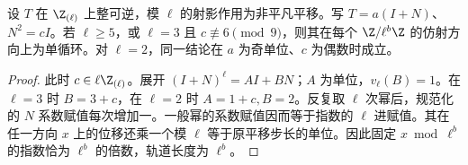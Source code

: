 \begin{lemma}\label{lem:local-cycle}
设 $T$ 在 $\Z_{(\ell)}$ 上整可逆，模 $\ell$ 的射影作用为非平凡平移。写 $T=a(I+N)$、$N^2=cI$。若 $\ell\ge5$，或 $\ell=3$ 且 $c\not\equiv6\pmod9$，则其在每个 $\Z/\ell^b\Z$ 的仿射方向上为单循环。对 $\ell=2$，同一结论在 $a$ 为奇单位、$c$ 为偶数时成立。
\end{lemma}
\begin{proof}
此时 $c\in\ell\Z_{(\ell)}$。展开 $(I+N)^\ell=A I+B N$；$A$ 为单位，$v_\ell(B)=1$。在 $\ell=3$ 时 $B=3+c$，在 $\ell=2$ 时 $A=1+c,B=2$。反复取 $\ell$ 次幂后，规范化的 $N$ 系数赋值每次增加一。一般幂的系数赋值因而等于指数的 $\ell$ 进赋值。其在任一方向 $x$ 上的位移还乘一个模 $\ell$ 等于原平移步长的单位。因此固定 $x\bmod\ell^b$ 的指数恰为 $\ell^b$ 的倍数，轨道长度为 $\ell^b$。
\end{proof}

